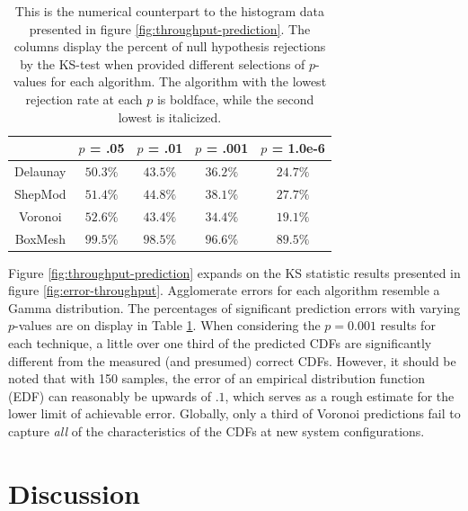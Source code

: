 \documentclass[smallextended,final]{svjour3}       %
\begin{document}
\begin{table}
  \renewcommand{\arraystretch}{1.3}
  \centering
  \begin{tabular}{c|c|c|c|c}
     & $p$ = .05 & $p$ = .01 & $p$ = .001 & $p$ = 1.0e-6\\
    \hline
    Delaunay & $\mathbf{50.3}\%$ & $\mathit{43.5}\%$ & $\mathit{36.2}\%$ & $\mathit{24.7}\%$\\
    ShepMod & $\mathit{51.4}\%$ & $44.8\%$ & $38.1\%$ & $27.7\%$\\
    Voronoi & $52.6\%$ & $\mathbf{43.4}\%$ & $\mathbf{34.4}\%$ & $\mathbf{19.1}\%$\\
    BoxMesh & $99.5\%$ & $98.5\%$ & $96.6\%$ & $89.5\%$\\
  \end{tabular}
  \caption{This is the numerical counterpart to the histogram data
    presented in figure \ref{fig:throughput-prediction}. The columns
    display the percent of null hypothesis rejections by the KS-test
    when provided different selections of $p$-values for each
    algorithm. The algorithm with the lowest rejection rate at each
    $p$ is boldface, while the second lowest is italicized.}
  \label{table:null-hypothesis-results}
\end{table}



Figure \ref{fig:throughput-prediction} expands on the KS statistic
results presented in figure \ref{fig:error-throughput}. Agglomerate
errors for each algorithm resemble a Gamma distribution. The
percentages of significant prediction errors with varying $p$-values
are on display in Table \ref{table:null-hypothesis-results}. When
considering the $p=0.001$ results for each technique, a little over
one third of the predicted CDFs are significantly different from the
measured (and presumed) correct CDFs. However, it should be noted that
with 150 samples, the error of an empirical distribution function
(EDF) can reasonably be upwards of $.1$, which serves as a rough
estimate for the lower limit of achievable error. Globally, only a
third of Voronoi predictions fail to capture \textit{all} of the
characteristics of the CDFs at new system configurations.

\section{Discussion}
\label{sec:discussion}
\end{document}
